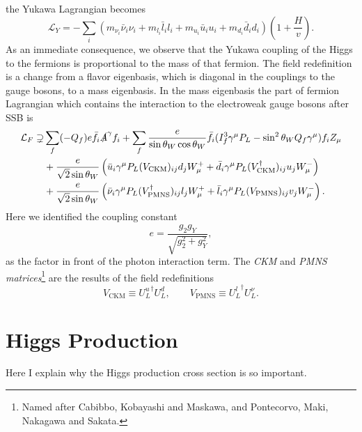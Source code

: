the Yukawa Lagrangian becomes
\begin{equation}
\mathcal{L}_Y = - \sum_{i}\left( m_{\nu_i} \bar{\nu}_i \nu_i + m_{l_i} \bar{l}_i l_i + m_{u_i} \bar{u}_i u_i + m_{d_i} \bar{d}_i d_i \right)  \left(1 + \frac{H}{v} \right).
\end{equation}
As an immediate consequence, we observe that the Yukawa coupling of the Higgs to the fermions is proportional to the mass of that fermion.
The field redefinition is a change from a flavor eigenbasis, which is diagonal in the couplings to the gauge bosons, to a mass eigenbasis. In the mass eigenbasis the part of fermion Lagrangian which contains the interaction to the electroweak gauge bosons after SSB is
\begin{equation}
\begin{split}
\mathcal{L}_F \supsetneq &\sum_f (-Q_f) e \bar{f}_i \slashed{A}^\gamma f_i + \sum_f \frac{e}{\sin \theta_W \cos \theta_W} \bar{f}_i ( I_f^3 \gamma^\mu P_L - \sin^2 \theta_W Q_f \gamma^\mu) f_i Z_\mu \\
&+ \frac{e}{\sqrt{2} \sin \theta_W} \left( \bar{u}_i \gamma^\mu P_L (V_\mathrm{CKM})_{ij} d_j W_\mu^+ + \bar{d}_i \gamma^\mu P_L (V_{\mathrm{CKM}}^\dagger)_{ij} u_j W_\mu^- \right) \\
&+ \frac{e}{\sqrt{2} \sin \theta_W} \left( \bar{\nu}_i \gamma^\mu P_L (V_\mathrm{PMNS}^\dagger)_{ij} l_j W_{\mu}^+ + \bar{l}_i \gamma^\mu P_L (V_\mathrm{PMNS})_{ij} v_j W_\mu^- \right).
\end{split}
\end{equation}
Here we identified the coupling constant
\begin{equation}
e = \frac{g_2 g_Y}{\sqrt{g_2^2 + g_Y^2}},
\end{equation}
as the factor in front of the photon interaction term. The \textit{CKM} and \textit{PMNS matrices}\footnote{Named after Cabibbo, Kobayashi and Maskawa, and Pontecorvo, Maki, Nakagawa and Sakata.} are the results of the field redefinitions
\begin{equation}
V_\mathrm{CKM} \equiv {U_L^{u}}^\dagger U_L^d, \qquad V_\mathrm{PMNS} \equiv {U_L^{l}}^\dagger U_L^\nu.
\end{equation}




\section{Higgs Production}
Here I explain why the Higgs production cross section is so important.


